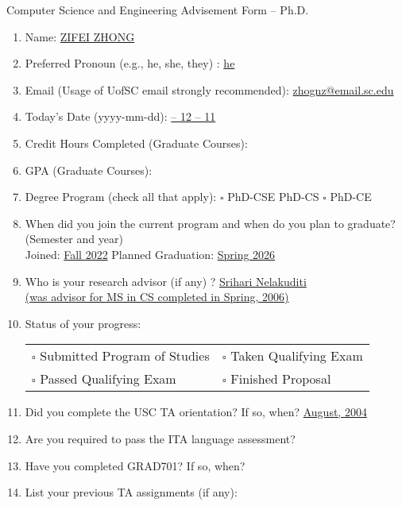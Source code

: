 \documentclass[11pt, oneside]{article}   	%
\begin{document}
\newpage
\centering \Large Computer Science and Engineering Advisement Form -- Ph.D.

\vspace{30pt}

\begin{enumerate}
\item Name: \underline{\quad ZIFEI ZHONG \quad}
\item Preferred Pronoun (e.g., he, she, they) : \underline{\quad he \quad}
\item Email (Usage of UofSC email strongly recommended): \underline{\quad zhognz@email.sc.edu \quad}
\item Today's Date (yyyy-mm-dd): \underline{ -- 12 -- 11 \quad}
\item Credit Hours Completed (Graduate Courses): \underline{ \quad}
\item GPA (Graduate Courses): \underline{ \quad}
\item Degree Program (check all that apply): $\square$ PhD-CSE \quad \makebox[0pt][l]{$\square$}\raisebox{.15ex}{\hspace{0.1em}$\checkmark$}  PhD-CS \quad $\square$ PhD-CE
\item When did you join the current program and when do you plan to graduate? (Semester and year)\\
 Joined: \underline{\quad Fall 2022\quad } \qquad Planned Graduation: \underline{\quad Spring 2026\quad}
\item Who is your research advisor (if any) ? \underline{\quad Srihari Nelakuditi \quad }\\
\underline{\quad (was advisor for MS in CS completed in Spring, 2006) \quad}
\item Status of your progress:\\
\begin{tabular}{l l}
$\square$ Submitted Program of Studies & $\square$ Taken Qualifying Exam\\
$\square$ Passed Qualifying Exam & $\square$ Finished Proposal
\end{tabular}
\item Did you complete the USC TA orientation? If so, when? \underline{\qquad August, 2004\qquad}
\item Are you required to pass the ITA language assessment? \underline{\qquad\qquad}
\item Have you completed GRAD701? If so, when? \underline{\qquad\qquad}
\item List your previous TA assignments (if any): 


\end{enumerate}
\end{document}
